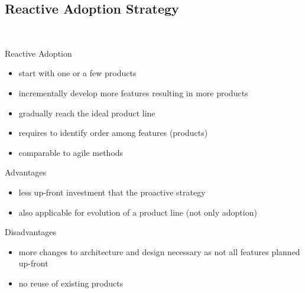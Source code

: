 \subsection{Reactive Adoption Strategy}
\begin{frame}{\myframetitle\ }
	\begin{fancycolumns}[animation=none]
		\begin{definition}{Reactive Adoption}
			\begin{itemize}
				\item start with one or a few products
				\item incrementally develop more features resulting in more products
				\item gradually reach the ideal product line
				\item requires to identify order among features (products)
				\item comparable to agile methods
			\end{itemize}
		\end{definition}
	\nextcolumn
		\begin{note}{Advantages}
			\begin{itemize}
				\item less up-front investment that the proactive strategy
				\item also applicable for evolution of a product line (not only adoption)
			\end{itemize}
		\end{note}
		\begin{note}{Disadvantages}
			\begin{itemize}
				\item more changes to architecture and design necessary as not all features planned up-front
				\item no reuse of existing products
			\end{itemize}
		\end{note}
	\end{fancycolumns}
\end{frame}


